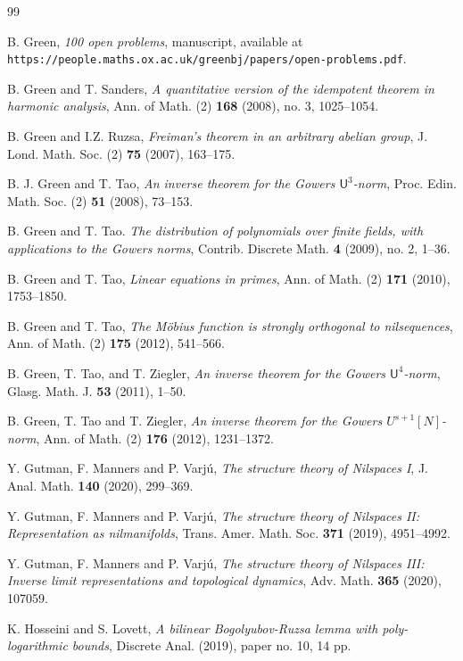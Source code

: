 \documentclass[a4paper,11pt]{article}
\numberwithin{theorem}{section}
\theoremstyle{definition}
\renewenvironment{thebibliography}[1]
{
  \begin{oldthebibliography}{#1}
    \setlength{\itemsep}{0em  plus 0.3ex}
    \setlength{\parskip}{0em}
}
{
  \end{oldthebibliography}
}
\begin{document}
\begin{thebibliography}{99}
 B. Green, \textit{100 open problems}, manuscript, available at\\ \verb+https://people.maths.ox.ac.uk/greenbj/papers/open-problems.pdf+.

 B. Green and T. Sanders, \textit{A quantitative version of the idempotent theorem in harmonic analysis}, Ann. of Math. (2) \textbf{168} (2008), no. 3, 1025--1054.

 B. Green and I.Z. Ruzsa, \textit{Freiman’s theorem in an arbitrary abelian group}, J. Lond. Math. Soc. (2) \textbf{75} (2007), 163--175.

 B. J. Green and T. Tao, \emph{An inverse theorem for the Gowers $\mathsf{U}^3$-norm}, Proc. Edin. Math. Soc. (2) \textbf{51} (2008), 73--153.

 B. Green and T. Tao. \emph{The distribution of polynomials over finite fields, with applications to the Gowers norms}, Contrib. Discrete Math. \textbf{4} (2009), no. 2, 1--36.

 B. Green and T. Tao, \textit{Linear equations in primes}, Ann. of Math. (2) \textbf{171} (2010), 1753--1850.

 B. Green and T. Tao, \textit{The M\"obius function is strongly orthogonal to nilsequences}, Ann. of Math. (2) \textbf{175} (2012), 541--566.

 B. Green, T. Tao, and T. Ziegler, \textit{An inverse theorem for the Gowers $\mathsf{U}^4$-norm}, Glasg. Math. J. \textbf{53} (2011), 1--50.

 B. Green, T. Tao and T. Ziegler, \textit{An inverse theorem for the Gowers $U^{s+1}[N]$-norm}, Ann. of Math. (2) \textbf{176} (2012), 1231--1372.

 Y. Gutman, F. Manners and P. Varj\'u, \emph{The structure theory of Nilspaces I}, J. Anal. Math. \textbf{140} (2020), 299--369.

 Y. Gutman, F. Manners and P. Varj\'u, \emph{The structure theory of Nilspaces II: Representation as nilmanifolds}, Trans. Amer. Math. Soc. \textbf{371} (2019), 4951--4992.

 Y. Gutman, F. Manners and P. Varj\'u, \emph{The structure theory of Nilspaces III: Inverse limit representations and topological dynamics}, Adv. Math. \textbf{365} (2020), 107059.

 K. Hosseini and S. Lovett, \emph{A bilinear Bogolyubov-Ruzsa lemma with poly-logarithmic bounds}, Discrete Anal. (2019), paper no. 10, 14 pp.


\end{thebibliography}
\end{document}
